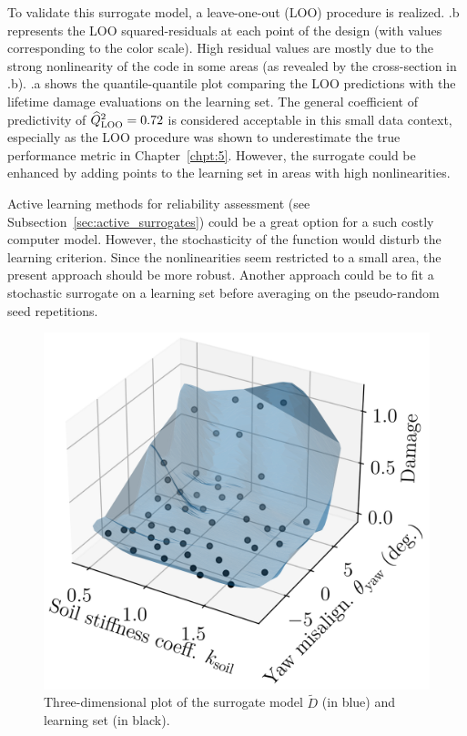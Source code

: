 To validate this surrogate model, a leave-one-out (LOO) procedure is realized. 
.b represents the LOO squared-residuals at each point of the design (with values corresponding to the color scale). 
High residual values are mostly due to the strong nonlinearity of the code in some areas (as revealed by the cross-section in .b).
.a shows the quantile-quantile plot comparing the LOO predictions with the lifetime damage evaluations on the learning set. 
The general coefficient of predictivity of $\widehat{Q}^2_{\mathrm{LOO}}=0.72$ is considered acceptable in this small data context, especially as the LOO procedure was shown to underestimate the true performance metric in Chapter~\ref{chpt:5}. 
However, the surrogate could be enhanced by adding points to the learning set in areas with high nonlinearities.

\medskip
\begin{remark}
    Active learning methods for reliability assessment (see Subsection~\ref{sec:active_surrogates}) could be a great option for a such costly computer model. 
    However, the stochasticity of the function would disturb the learning criterion. 
    Since the nonlinearities seem restricted to a small area, the present approach should be more robust. 
    Another approach could be to fit a stochastic surrogate \citep{binois_2019_replication,baker_2022_stochastic_surrogates_review,zhu_2023_thesis} on a learning set before averaging on the pseudo-random seed repetitions.  
\end{remark}
\medskip

\begin{figure}[h!]
    \centering
    \includegraphics[width=0.45\linewidth]{./part3/figures/OWT/3D_surrogate.png}
    \caption{Three-dimensional plot of the surrogate model $\widetilde{D}$ (in blue) and learning set (in black).}
    \label{fig:3d_owt_surrogate}
\end{figure}

